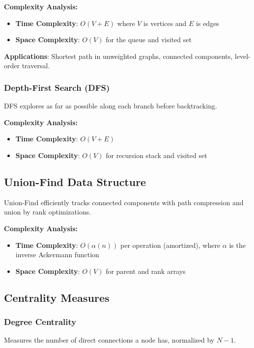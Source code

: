 \documentclass[12pt,a4paper]{article}
\begin{document}
\textbf{Complexity Analysis:}
\begin{itemize}
    \item \textbf{Time Complexity}: $O(V + E)$ where $V$ is vertices and $E$ is edges
    \item \textbf{Space Complexity}: $O(V)$ for the queue and visited set
\end{itemize}

\textbf{Applications}: Shortest path in unweighted graphs, connected components, level-order traversal.

\subsubsection{Depth-First Search (DFS)}
DFS explores as far as possible along each branch before backtracking.

\textbf{Complexity Analysis:}
\begin{itemize}
    \item \textbf{Time Complexity}: $O(V + E)$
    \item \textbf{Space Complexity}: $O(V)$ for recursion stack and visited set
\end{itemize}

\subsection{Union-Find Data Structure}
Union-Find efficiently tracks connected components with path compression and union by rank optimizations.

\textbf{Complexity Analysis:}
\begin{itemize}
    \item \textbf{Time Complexity}: $O(\alpha(n))$ per operation (amortized), where $\alpha$ is the inverse Ackermann function
    \item \textbf{Space Complexity}: $O(V)$ for parent and rank arrays
\end{itemize}

\subsection{Centrality Measures}

\subsubsection{Degree Centrality}
Measures the number of direct connections a node has, normalized by $N-1$.
\end{document}
